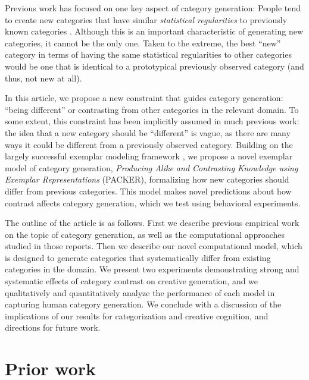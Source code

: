 \documentclass[12pt]{article}
\begin{document}
\begin{flushleft}
Previous work has focused on one key aspect of category generation: People tend to create new categories that have similar {\em statistical regularities} to previously known categories \citep{jern2013probabilistic,ward1994structured}. Although this is an important characteristic of generating new categories, it cannot be the only one. Taken to the extreme, the best ``new'' category in terms of having the same statistical regularities to other categories would be one that is identical to a prototypical previously observed category (and thus, not new at all). 

In this article, we propose a new constraint that guides category generation: ``being different'' or contrasting from other categories in the relevant domain. To some extent, this constraint has been implicitly assumed in much previous work: the idea that a new category should be ``different'' is vague, as there are many ways it could be different from a previously observed category. Building on the largely successful exemplar modeling framework \citep{medin1978context,nosofsky1984choice,nosofsky1986attention}, we propose a novel exemplar model of category generation, {\em Producing Alike and Contrasting Knowledge using Exemplar Representations} (PACKER), formalizing how new categories should differ from previous categories. This model makes novel predictions about how contrast affects category generation, which we test using behavioral experiments.

The outline of the article is as follows. First we describe previous empirical work on the topic of category generation, as well as the computational approaches studied in those reports. Then we describe our novel computational model, which is designed to generate categories that systematically differ from existing categories in the domain. We present two experiments demonstrating strong and systematic effects of category contrast on creative generation, and we qualitatively and quantitatively analyze the performance of each model in capturing human category generation. We conclude with a discussion of the implications of our results for categorization and creative cognition, and directions for future work.

\section{Prior work}


\end{flushleft}
\end{document}
